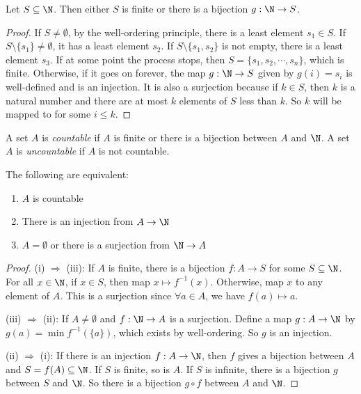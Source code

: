 \documentclass[a4paper]{article}
\begin{document}
  \begin{lemma}
    Let $S\subseteq \N$. Then either $S$ is finite or there is a bijection $g:\N \to S$.
  \end{lemma}

  \begin{proof}
    If $S\not= \emptyset$, by the well-ordering principle, there is a least element $s_1\in S$. If $S\setminus \{s_1\} \not= \emptyset$, it has a least element $s_2$. If $S\setminus \{s_1, s_2\}$ is not empty, there is a least element $s_3$. If at some point the process stops, then $S = \{s_1, s_2,\cdots, s_n\}$, which is finite. Otherwise, if it goes on forever, the map $g: \N \to S$ given by $g(i) = s_i$ is well-defined and is an injection. It is also a surjection because if $k\in S$, then $k$ is a natural number and there are at most $k$ elements of $S$ less than $k$.  So $k$ will be mapped to for some $i\leq k$.
  \end{proof}

  \begin{defi}
    A set $A$ is \emph{countable} if $A$ is finite or there is a bijection between $A$ and $\N$. A set $A$ is \emph{uncountable} if $A$ is not countable. 
  \end{defi}

  \begin{thm}
    The following are equivalent:
    \begin{enumerate}
      \item $A$ is countable
      \item There is an injection from $A\to \N$
      \item $A = \emptyset$ or there is a surjection from $\N \to A$
    \end{enumerate}
  \end{thm}

  \begin{proof}
    (i) $\Rightarrow$ (iii): If $A$ is finite, there is a bijection $f: A \to S$ for some $S\subseteq \N$. For all $x\in \N$, if $x\in S$, then map $x\mapsto f^{-1}(x)$. Otherwise, map $x$ to any element of $A$. This is a surjection since $\forall a\in A$, we have $f(a)\mapsto a$.

    (iii) $\Rightarrow$ (ii): If $A\not= \emptyset$ and $f: \N\to A$ is a surjection. Define a map $g: A\to \N$ by $g(a) = \min f^{-1}(\{a\})$, which exists by well-ordering. So $g$ is an injection.

    (ii) $\Rightarrow$ (i): If there is an injection $f: A\to \N$, then $f$ gives a bijection between $A$ and $S = f(A)\subseteq \N$. If $S$ is finite, so is $A$. If $S$ is infinite, there is a bijection $g$ between $S$ and $\N$. So there is a bijection $g\circ f$ between $A$ and $\N$.
  \end{proof}
\end{document}
